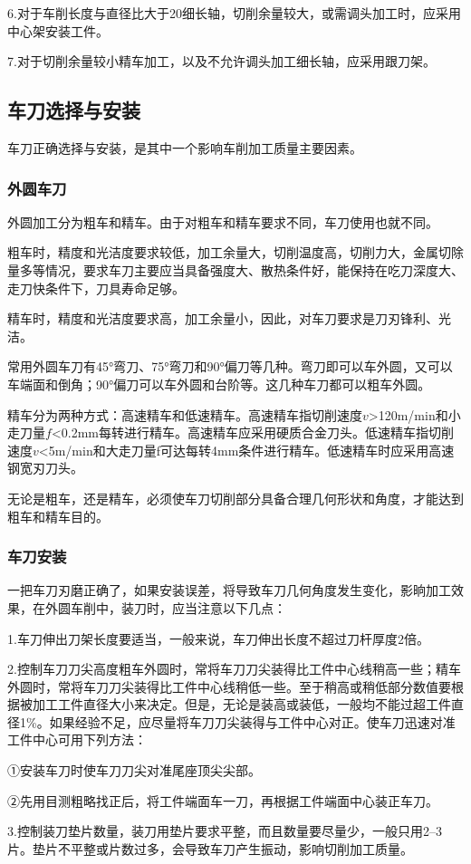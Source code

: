 \documentclass{ctexbook}
\begin{document}
6.对于车削长度与直径比大于20细长轴，切削余量较大，或需调头加工时，应采用中心架安装工件。

7.对于切削余量较小精车加工，以及不允许调头加工细长轴，应采用跟刀架。
\subsection{车刀选择与安装}
车刀正确选择与安装，是其中一个影响车削加工质量主要因素。
\subsubsection{外圆车刀}
外圆加工分为粗车和精车。由于对粗车和精车要求不同，车刀使用也就不同。

粗车时，精度和光洁度要求较低，加工余量大，切削温度高，切削力大，金属切除量多等情况，要求车刀主要应当具备强度大、散热条件好，能保持在吃刀深度大、走刀快条件下，刀具寿命足够。

精车时，精度和光洁度要求高，加工余量小，因此，对车刀要求是刀刃锋利、光洁。

常用外圆车刀有45°弯刀、75°弯刀和90°偏刀等几种。弯刀即可以车外圆，又可以车端面和倒角；90°偏刀可以车外圆和台阶等。这几种车刀都可以粗车外圆。

精车分为两种方式：高速精车和低速精车。高速精车指切削速度$v$>120m/min和小走刀量$f$<0.2mm每转进行精车。高速精车应采用硬质合金刀头。低速精车指切削速度$v$<5m/min和大走刀量f可达每转4mm条件进行精车。低速精车时应采用高速钢宽刃刀头。

无论是粗车，还是精车，必须使车刀切削部分具备合理几何形状和角度，才能达到粗车和精车目的。
\subsubsection{车刀安装}
一把车刀刃磨正确了，如果安装误差，将导致车刀几何角度发生变化，影晌加工效果，在外圆车削中，装刀时，应当注意以下几点：

1.车刀伸出刀架长度要适当，一般来说，车刀伸出长度不超过刀杆厚度2倍。

2.控制车刀刀尖高度粗车外圆时，常将车刀刀尖装得比工件中心线稍高一些；精车外圆时，常将车刀刀尖装得比工件中心线稍低一些。至于稍高或稍低部分数值要根据被加工工件直径大小来决定。但是，无论是装高或装低，一般均不能过超工件直径1\%。如果经验不足，应尽量将车刀刀尖装得与工件中心对正。使车刀迅速对准工件中心可用下列方法：

①安装车刀时使车刀刀尖对准尾座顶尖尖部。

②先用目测粗略找正后，将工件端面车一刀，再根据工件端面中心装正车刀。

3.控制装刀垫片数量，装刀用垫片要求平整，而且数量要尽量少，一般只用2--3片。垫片不平整或片数过多，会导致车刀产生振动，影响切削加工质量。
\end{document}
